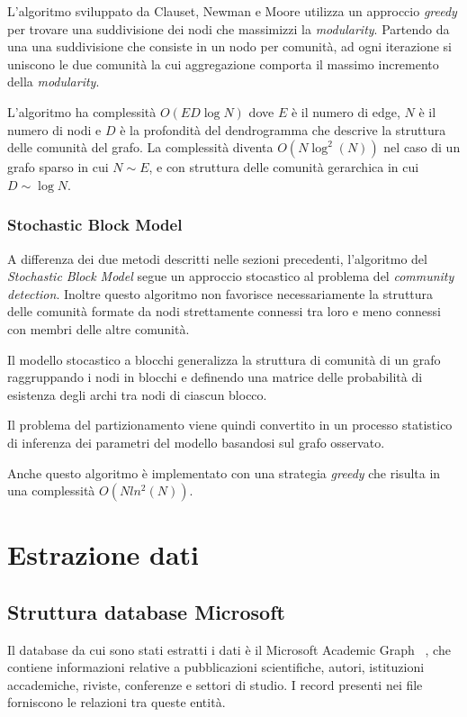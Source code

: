 \documentclass[12pt,a4paper,twoside]{report}
\begin{document}
L'algoritmo sviluppato da Clauset, Newman e Moore utilizza un approccio \textit{greedy} per trovare
una suddivisione dei nodi che massimizzi la \textit{modularity}. Partendo da una una suddivisione
che consiste in un nodo per comunità, ad ogni iterazione si uniscono le due comunità la cui
aggregazione comporta il massimo incremento della \textit{modularity}.

L'algoritmo ha complessità $O(ED\log N)$ dove $E$ è il numero di edge, $N$ è il numero di nodi e $D$
è la profondità del dendrogramma che descrive la struttura delle comunità del grafo. La complessità
diventa $O(N\log^{2}(N))$ nel caso di un grafo sparso in cui $N\sim E$, e con struttura delle
comunità gerarchica in cui $D\sim\log N$.

\subsection{Stochastic Block Model} \label{subsec:bn}

A differenza dei due metodi descritti nelle sezioni precedenti, l'algoritmo del \textit{Stochastic
Block Model} segue un approccio stocastico al problema del \textit{community detection}. Inoltre
questo algoritmo non favorisce necessariamente la struttura delle comunità formate da nodi
strettamente connessi tra loro e meno connessi con membri delle altre comunità.

Il modello stocastico a blocchi generalizza la struttura di comunità di un grafo raggruppando i nodi
in blocchi e definendo una matrice delle probabilità di esistenza degli archi tra nodi di ciascun
blocco.

Il problema del partizionamento viene quindi convertito in un processo statistico di inferenza dei
parametri del modello basandosi sul grafo osservato.

Anche questo algoritmo è implementato con una strategia \textit{greedy} che risulta in una
complessità $O(N ln^2(N))$.

\whitePage
\chapter{Estrazione dati} \label{cap:estrazione}

\section{Struttura database Microsoft} \label{sec:msr}
Il database da cui sono stati estratti i dati è il Microsoft Academic Graph~
\cite{Sinha:2015:OMA:2740908.2742839}, che contiene informazioni relative a pubblicazioni
scientifiche, autori, istituzioni accademiche, riviste, conferenze e settori di studio. I record
presenti nei file forniscono le relazioni tra queste entità.
\end{document}
